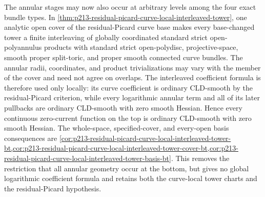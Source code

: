 The annular stages may now also occur at arbitrary levels among the four
exact bundle types.  In
\cref{thm:p213-residual-picard-curve-local-interleaved-tower}, one analytic
open cover of the residual-Picard curve base makes every base-changed tower
a finite interleaving of globally coordinated standard strict
open-polyannulus products with standard strict open-polydisc,
projective-space, smooth proper split-toric, and proper smooth connected
curve bundles.  The annular radii, coordinates, and product trivializations
may vary with the member of the cover and need not agree on overlaps.  The
interleaved coefficient formula is therefore used only locally: its curve
coefficient is ordinary CLD-smooth by the residual-Picard criterion, while
every logarithmic annular term and all of its later pullbacks are ordinary
CLD-smooth with zero smooth Hessian.  Hence every continuous zero-current
function on the top is ordinary CLD-smooth with zero smooth Hessian.  The
whole-space, specified-cover, and every-open basis consequences are
\cref{cor:p213-residual-picard-curve-local-interleaved-tower-bt,cor:p213-residual-picard-curve-local-interleaved-tower-cover-bt,cor:p213-residual-picard-curve-local-interleaved-tower-basis-bt}.
This removes the restriction that all annular geometry occur at the bottom,
but gives no global logarithmic coefficient formula and retains both the
curve-local tower charts and the residual-Picard hypothesis.

